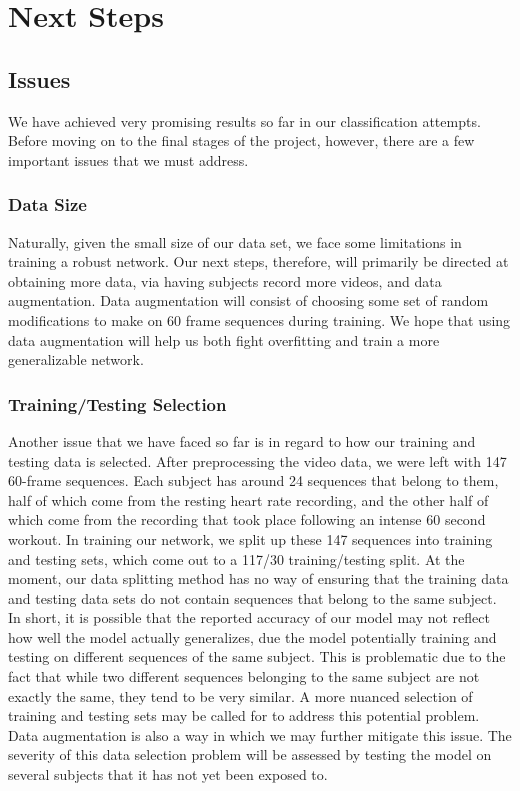 \documentclass{article}
\begin{document}
\section*{Next Steps}{
\subsection*{Issues}{We have achieved very promising results so far in our classification attempts. Before moving on to the final stages of the project, however, there are a few important issues that we must address.
\subsubsection*{Data Size}{Naturally, given the small size of our data set, we face some limitations in training a robust network. Our next steps, therefore, will primarily be directed at obtaining more data, via having subjects record more videos, and data augmentation. Data augmentation will consist of choosing some set of random modifications to make on 60 frame sequences during training. We hope that using data augmentation will help us both fight overfitting and train a more generalizable network.}
\subsubsection*{Training/Testing Selection}{Another issue that we have faced so far is in regard to how our training and testing data is selected. After preprocessing the video data, we were left with 147 60-frame sequences. Each subject has around 24 sequences that belong to them, half of which come from the resting heart rate recording, and the other half of which come from the recording that took place following an intense 60 second workout. In training our network, we split up these 147 sequences into training and testing sets, which come out to a 117/30 training/testing split. At the moment, our data splitting method has no way of ensuring that the training data and testing data sets do not contain sequences that belong to the same subject. In short, it is possible that the reported accuracy of our model may not reflect how well the model actually generalizes, due the model potentially training and testing on different sequences of the same subject. This is problematic due to the fact that while two different sequences belonging to the same subject are not exactly the same, they tend to be very similar. A more nuanced selection of training and testing sets may be called for to address this potential problem. Data augmentation is also a way in which we may further mitigate this issue. The severity of this data selection problem will be assessed by testing the model on several subjects that it has not yet been exposed to.
}
}}
\end{document}
